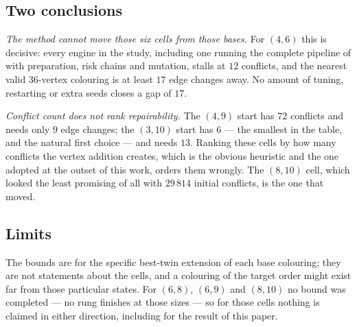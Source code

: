 \subsection*{Two conclusions}

\emph{The method cannot move those six cells from those bases.} For $(4,6)$ this is decisive: every
engine in the study, including one running the complete pipeline of \cite{cremer} with preparation,
risk chains and mutation, stalls at $12$ conflicts, and the nearest valid $36$-vertex colouring is at
least $17$ edge changes away. No amount of tuning, restarting or extra seeds closes a gap of $17$.

\emph{Conflict count does not rank repairability.} The $(4,9)$ start has $72$ conflicts and needs only
$9$ edge changes; the $(3,10)$ start has $6$ --- the smallest in the table, and the natural first
choice --- and needs $13$. Ranking these cells by how many conflicts the vertex addition creates, which
is the obvious heuristic and the one adopted at the outset of this work, orders them wrongly. The
$(8,10)$ cell, which looked the least promising of all with $29\,814$ initial conflicts, is the one
that moved.

\subsection*{Limits}

The bounds are for the specific best-twin extension of each base colouring; they are not statements
about the cells, and a colouring of the target order might exist far from those particular states. For
$(6,8)$, $(6,9)$ and $(8,10)$ no bound was completed --- no rung finishes at those sizes --- so for
those cells nothing is claimed in either direction, including for the result of this paper.
